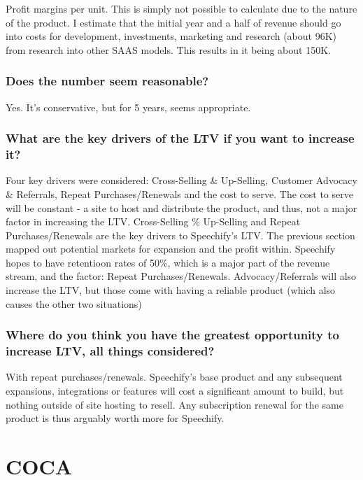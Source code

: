 \documentclass{article}
\begin{document}
        Profit margins per unit. This is simply not possible to calculate due to the nature of the product. I estimate that the initial year and a half of revenue should go into costs for development, investments, marketing and research (about 96K) from research into other SAAS models. This results in it being about 150K.

        \subsubsection{Does the number seem reasonable?}

        Yes. It's conservative, but for 5 years, seems appropriate.

        \subsubsection{What are the key drivers of the LTV if you want to increase it?}

        Four key drivers were considered: Cross-Selling \& Up-Selling, Customer Advocacy \& Referrals, Repeat Purchases/Renewals and the cost to serve. The cost to serve will be constant - a site to host and distribute the product, and thus, not a major factor in increasing the LTV. Cross-Selling \% Up-Selling and Repeat Purchases/Renewals are the key drivers to Speechify's LTV. The previous section mapped out potential markets for expansion and the profit within. Speechify hopes to have retentioon rates of 50\%, which is a major part of the revenue stream, and the factor: Repeat Purchases/Renewals. Advocacy/Referrals will also increase the LTV, but those come with having a reliable product (which also causes the other two situations)

        \subsubsection{Where do you think you have the greatest opportunity to increase LTV, all things considered?}

        With repeat purchases/renewals. Speechify's base product and any subsequent expansions, integrations or features will cost a significant amount to build, but nothing outside of site hosting to resell. Any subscription renewal for the same product is thus arguably worth more for Speechify.

    \section{COCA}
\end{document}
